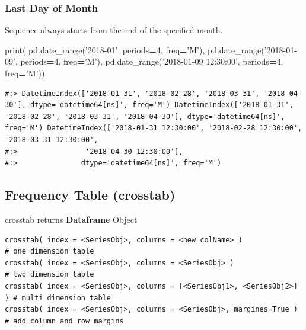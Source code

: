 \documentclass[
]{book}
\newenvironment{Shaded}{\begin{snugshade}}{\end{snugshade}}
\newcommand{\BuiltInTok}[1]{#1}
\newcommand{\DecValTok}[1]{\textcolor[rgb]{0.06,0.06,0.06}{#1}}
\newcommand{\NormalTok}[1]{#1}
\newcommand{\OperatorTok}[1]{\textcolor[rgb]{0.43,0.43,0.43}{\textbf{#1}}}
\newcommand{\StringTok}[1]{\textcolor[rgb]{0.5,0.5,0.5}{#1}}
\begin{document}
\hypertarget{last-day-of-month}{%
\subsubsection{Last Day of Month}\label{last-day-of-month}}

Sequence always starts from the end of the specified month.

\begin{Shaded}
\begin{Highlighting}[]
\BuiltInTok{print}\NormalTok{(}
\NormalTok{  pd.date_range(}\StringTok{'2018-01'}\NormalTok{, periods}\OperatorTok{=}\DecValTok{4}\NormalTok{, freq}\OperatorTok{=}\StringTok{'M'}\NormalTok{),}
\NormalTok{  pd.date_range(}\StringTok{'2018-01-09'}\NormalTok{, periods}\OperatorTok{=}\DecValTok{4}\NormalTok{, freq}\OperatorTok{=}\StringTok{'M'}\NormalTok{),}
\NormalTok{  pd.date_range(}\StringTok{'2018-01-09 12:30:00'}\NormalTok{, periods}\OperatorTok{=}\DecValTok{4}\NormalTok{, freq}\OperatorTok{=}\StringTok{'M'}\NormalTok{))}
\end{Highlighting}
\end{Shaded}

\begin{verbatim}
#:> DatetimeIndex(['2018-01-31', '2018-02-28', '2018-03-31', '2018-04-30'], dtype='datetime64[ns]', freq='M') DatetimeIndex(['2018-01-31', '2018-02-28', '2018-03-31', '2018-04-30'], dtype='datetime64[ns]', freq='M') DatetimeIndex(['2018-01-31 12:30:00', '2018-02-28 12:30:00', '2018-03-31 12:30:00',
#:>                '2018-04-30 12:30:00'],
#:>               dtype='datetime64[ns]', freq='M')
\end{verbatim}

\hypertarget{frequency-table-crosstab}{%
\subsection{Frequency Table (crosstab)}\label{frequency-table-crosstab}}

crosstab returns \textbf{Dataframe} Object

\begin{verbatim}
crosstab( index = <SeriesObj>, columns = <new_colName> )                # one dimension table
crosstab( index = <SeriesObj>, columns = <SeriesObj> )                  # two dimension table
crosstab( index = <SeriesObj>, columns = [<SeriesObj1>, <SeriesObj2>] ) # multi dimension table   
crosstab( index = <SeriesObj>, columns = <SeriesObj>, margines=True )   # add column and row margins
\end{verbatim}
\end{document}
